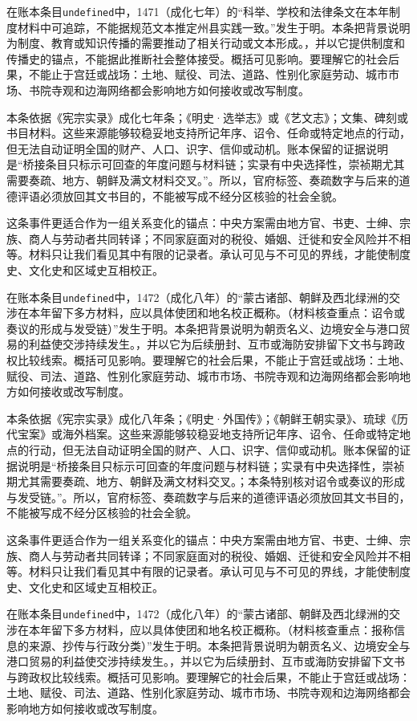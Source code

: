 在账本条目\texttt{undefined}中，1471（成化七年）的“科举、学校和法律条文在本年制度材料中可追踪，不能据规范文本推定州县实践一致。”发生于明。本条把背景说明为制度、教育或知识传播的需要推动了相关行动或文本形成。，并以它提供制度和传播史的锚点，不能据此推断社会整体接受。概括可见影响。要理解它的社会后果，不能止于宫廷或战场：土地、赋役、司法、道路、性别化家庭劳动、城市市场、书院寺观和边海网络都会影响地方如何接收或改写制度。

本条依据《宪宗实录》成化七年条；《明史·选举志》或《艺文志》；文集、碑刻或书目材料。这些来源能够较稳妥地支持所记年序、诏令、任命或特定地点的行动，但无法自动证明全国的财产、人口、识字、信仰或动机。账本保留的证据说明是“桥接条目只标示可回查的年度问题与材料链；实录有中央选择性，崇祯期尤其需要奏疏、地方、朝鲜及满文材料交叉。”。所以，官府标签、奏疏数字与后来的道德评语必须放回其文书目的，不能被写成不经分区核验的社会全貌。

这条事件更适合作为一组关系变化的锚点：中央方案需由地方官、书吏、士绅、宗族、商人与劳动者共同转译；不同家庭面对的税役、婚姻、迁徙和安全风险并不相等。材料只让我们看见其中有限的记录者。承认可见与不可见的界线，才能使制度史、文化史和区域史互相校正。

在账本条目\texttt{undefined}中，1472（成化八年）的“蒙古诸部、朝鲜及西北绿洲的交涉在本年留下多方材料，应以具体使团和地名校正概称。（材料核查重点：诏令或奏议的形成与发受链）”发生于明。本条把背景说明为朝贡名义、边境安全与港口贸易的利益使交涉持续发生。，并以它为后续册封、互市或海防安排留下文书与跨政权比较线索。概括可见影响。要理解它的社会后果，不能止于宫廷或战场：土地、赋役、司法、道路、性别化家庭劳动、城市市场、书院寺观和边海网络都会影响地方如何接收或改写制度。

本条依据《宪宗实录》成化八年条；《明史·外国传》；《朝鲜王朝实录》、琉球《历代宝案》或海外档案。这些来源能够较稳妥地支持所记年序、诏令、任命或特定地点的行动，但无法自动证明全国的财产、人口、识字、信仰或动机。账本保留的证据说明是“桥接条目只标示可回查的年度问题与材料链；实录有中央选择性，崇祯期尤其需要奏疏、地方、朝鲜及满文材料交叉。；本条特别核对诏令或奏议的形成与发受链。”。所以，官府标签、奏疏数字与后来的道德评语必须放回其文书目的，不能被写成不经分区核验的社会全貌。

这条事件更适合作为一组关系变化的锚点：中央方案需由地方官、书吏、士绅、宗族、商人与劳动者共同转译；不同家庭面对的税役、婚姻、迁徙和安全风险并不相等。材料只让我们看见其中有限的记录者。承认可见与不可见的界线，才能使制度史、文化史和区域史互相校正。

在账本条目\texttt{undefined}中，1472（成化八年）的“蒙古诸部、朝鲜及西北绿洲的交涉在本年留下多方材料，应以具体使团和地名校正概称。（材料核查重点：报称信息的来源、抄传与行政分类）”发生于明。本条把背景说明为朝贡名义、边境安全与港口贸易的利益使交涉持续发生。，并以它为后续册封、互市或海防安排留下文书与跨政权比较线索。概括可见影响。要理解它的社会后果，不能止于宫廷或战场：土地、赋役、司法、道路、性别化家庭劳动、城市市场、书院寺观和边海网络都会影响地方如何接收或改写制度。

